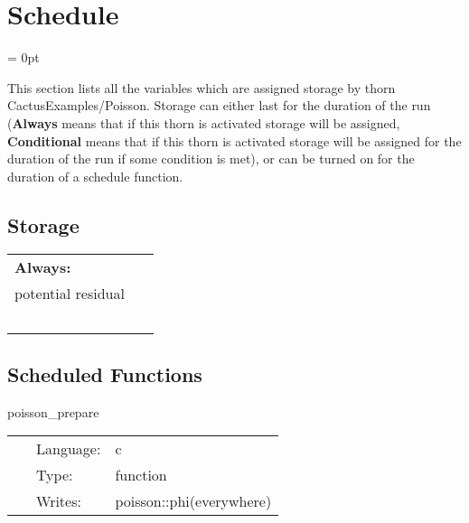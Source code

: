 
\section{Schedule} 


\parskip = 0pt


\noindent This section lists all the variables which are assigned storage by thorn CactusExamples/Poisson.  Storage can either last for the duration of the run ({\bf Always} means that if this thorn is activated storage will be assigned, {\bf Conditional} means that if this thorn is activated storage will be assigned for the duration of the run if some condition is met), or can be turned on for the duration of a schedule function.


\subsection*{Storage}

\hspace{5mm}

 \begin{tabular*}{160mm}{ll} 

{\bf Always:}&  ~ \\ 
 potential residual & ~\\ 
~ & ~\\ 
\end{tabular*} 


\subsection*{Scheduled Functions}
\vspace{5mm}


\hspace{5mm} poisson\_prepare 

\hspace{5mm}{\it set up initial guess for initial data } 


\hspace{5mm}

 \begin{tabular*}{160mm}{cll} 
~ & Language:  & c \\ 
~ & Type:  & function \\ 
~ & Writes:  & poisson::phi(everywhere) \\ 
\end{tabular*} 


\vspace{5mm}

